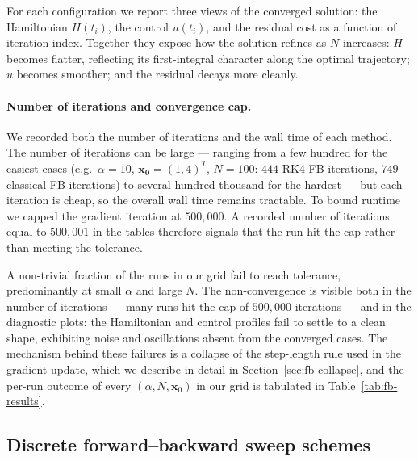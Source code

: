 \documentclass[a4paper, 10pt]{article}
\begin{document}
For each configuration we report three views of the converged solution:
the Hamiltonian $H(t_i)$, the control $u(t_i)$, and the residual cost as a
function of iteration index. Together they expose how the solution refines
as $N$ increases: $H$ becomes flatter, reflecting its first-integral
character along the optimal trajectory; $u$ becomes smoother; and the
residual decays more cleanly.

\paragraph{Number of iterations and convergence cap.}
We recorded both the number of iterations and the wall time of each
method. The number of iterations can be large --- ranging from a few
hundred for the easiest cases (e.g.\ $\alpha = 10$, $\mathbf{x_0} =
(1,4)^T$, $N = 100$: $444$ RK4-FB iterations, $749$ classical-FB
iterations) to several hundred thousand for the hardest --- but each
iteration is cheap, so the overall wall time remains tractable. To
bound runtime we capped the gradient iteration at $500{,}000$. A
recorded number of iterations equal to $500{,}001$ in the tables
therefore signals that the run hit the cap rather than meeting the
tolerance.

A non-trivial fraction of the runs in our grid fail to reach
tolerance, predominantly at small $\alpha$ and large $N$. The non-convergence
is visible both in the number of iterations --- many runs hit the cap of
$500{,}000$ iterations --- and in the diagnostic plots: the Hamiltonian and
control profiles fail to settle to a clean shape, exhibiting noise and
oscillations absent from the converged cases. The mechanism behind these
failures is a collapse of the step-length rule used in the gradient
update, which we describe in detail in
Section~\ref{sec:fb-collapse}, and the per-run outcome of every
$(\alpha, N, \bm{x}_0)$ in our grid is tabulated in
Table~\ref{tab:fb-results}.

\subsection{Discrete forward--backward sweep schemes}
\label{sec:fb-schemes}
\end{document}
